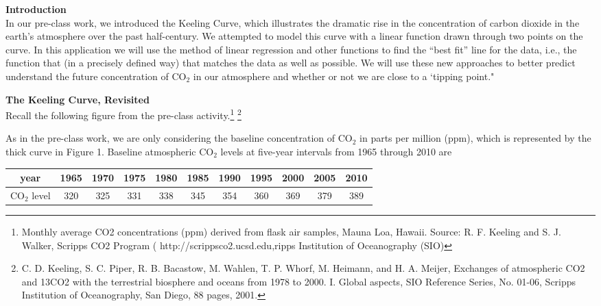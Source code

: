 \documentclass[11pt]{article}
\begin{document}
\pagestyle{otherpages}
\thispagestyle{firstpage}
\vspace*{.85in}


{\bf Introduction}\\

In our pre-class work, we introduced the Keeling Curve, which illustrates the dramatic rise in the concentration of carbon dioxide in the earth's atmosphere over the past half-century. We  attempted to model this curve with a linear function drawn through two points on the curve. In this application we will use the method of linear regression and other functions  to find the ``best fit'' line for the data, i.e., the  function that (in a precisely defined way) that matches the data as well as possible. We will use these new approaches to better predict  understand  the future concentration of CO$_2$ in our atmosphere and whether or not we are close to a `tipping point."

\vspace{0.5cm}


{\bf The Keeling Curve, Revisited}\\


Recall the following figure from the pre-class activity.\footnote{Monthly average CO2 concentrations (ppm) derived from flask air samples,  Mauna Loa, Hawaii. Source: R. F. Keeling and S. J. Walker, Scripps CO2 Program ( http://scrippsco2.ucsd.edu,ripps Institution of Oceanography (SIO) } 
\footnote{ C. D. Keeling, S. C. Piper, R. B. Bacastow, M. Wahlen, T. P. Whorf, M. Heimann, and   H. A. Meijer, Exchanges of atmospheric CO2 and 13CO2 with the terrestrial biosphere and   oceans from 1978 to 2000.  I. Global aspects, SIO Reference Series, No. 01-06, Scripps   Institution of Oceanography, San Diego, 88 pages, 2001. }\\



\vspace{0.2cm}

As in the pre-class work, we are only considering the baseline concentration of CO$_2$ in parts per million (ppm), which is represented by the thick curve in Figure 1.  Baseline atmospheric CO$_2$ levels at five-year intervals from 1965 through 2010 are
\begin{center}
\begin{tabular}{|c|c|c|c|c|c|c|c|c|c|c|}
\hline
year & 1965 & 1970 & 1975 & 1980 & 1985 & 1990 & 1995 & 2000 & 2005 & 2010 \\
\hline
CO$_2$ level & 320 & 325 & 331 & 338 & 345 & 354 & 360 & 369 & 379 & 389 \\
\hline
\end{tabular}
\end{center}
\end{document}

